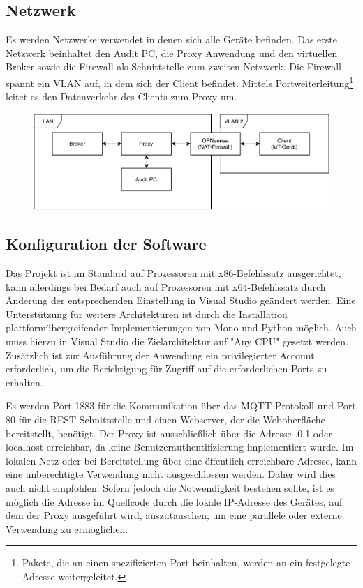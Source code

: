    \subsection{Netzwerk}
    Es werden Netzwerke verwendet in denen sich alle Geräte befinden. 
    Das erste Netzwerk beinhaltet den Audit PC, die Proxy Anwendung und den virtuellen Broker sowie die Firewall als Schnittstelle zum zweiten Netzwerk.
    Die Firewall spannt ein \ac{VLAN} auf, in dem sich der Client befindet. Mittels Portweiterleitung\footnote{Pakete, die an einen spezifizierten Port beinhalten, werden an ein festgelegte Adresse weitergeleitet.} leitet es den Datenverkehr des Clients zum Proxy um. %
    
    \begin{figure}[h]%
        \centering
        \includegraphics[width=14cm]{tex/bilder/6_validierung/Netzwerkdiagramm.pdf}
        \label{fig:virtuelles_netzwerk}
    \end{figure}
    
    \subsection{Konfiguration der Software} \label{KonfigurationDerSoftware}
    Das Projekt ist im Standard auf Prozessoren mit x86-Befehlssatz ausgerichtet, kann allerdings bei Bedarf auch auf Prozessoren mit x64-Befehlssatz durch Änderung der entsprechenden Einstellung in Visual Studio geändert werden.
    Eine Unterstützung für weitere Architekturen ist durch die Installation plattformübergreifender Implementierungen von Mono und Python möglich. Auch muss hierzu in Visual Studio die Zielarchitektur auf "Any CPU" gesetzt werden. 
    Zusätzlich ist zur Ausführung der Anwendung ein privilegierter Account erforderlich, um die Berichtigung für Zugriff auf die erforderlichen Ports zu erhalten.
    
    Es werden Port 1883 für die Kommunikation über das \ac{MQTT}-Protokoll und Port 80 für die \ac{REST} Schnittstelle und einen Webserver, der die Weboberfläche bereitstellt, benötigt.
    Der Proxy ist ausschließlich über die Adresse .0.1\grqq{} oder \glqq localhost\grqq{} erreichbar, da keine Benutzerauthentifizierung implementiert wurde. Im lokalen Netz oder bei Bereitstellung über eine öffentlich erreichbare Adresse, kann eine unberechtigte Verwendung nicht ausgeschlossen werden. Daher wird dies auch nicht empfohlen. Sofern jedoch die Notwendigkeit bestehen sollte, ist es möglich die Adresse im Quellcode durch die lokale IP-Adresse des Gerätes, auf dem der Proxy ausgeführt wird, auszutauschen, um eine parallele oder externe Verwendung zu ermöglichen.

